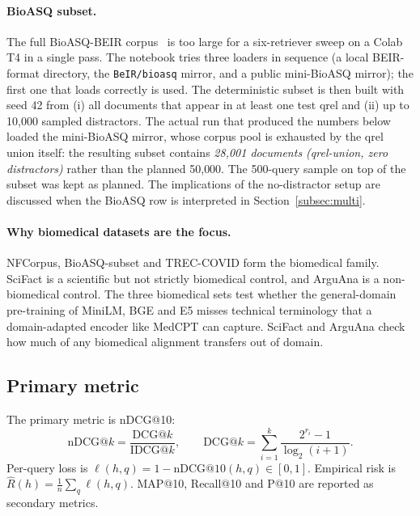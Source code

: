 \documentclass[11pt,a4paper]{article}
\begin{document}
\paragraph{BioASQ subset.}
The full BioASQ-BEIR corpus~\cite{Tsatsaronis2015BioASQ} is too large
for a six-retriever sweep on a Colab T4 in a single pass. The notebook
tries three loaders in sequence (a local BEIR-format directory, the
\texttt{BeIR/bioasq} mirror, and a public mini-BioASQ mirror); the first
one that loads correctly is used. The deterministic subset is then
built with seed 42 from (i) all documents that appear in at least one
test qrel and (ii) up to 10{,}000 sampled distractors. The actual run
that produced the numbers below loaded the mini-BioASQ mirror, whose
corpus pool is exhausted by the qrel union itself: the resulting subset
contains \emph{28{,}001 documents (qrel-union, zero distractors)}
rather than the planned 50{,}000. The 500-query sample on top of the
subset was kept as planned. The implications of the no-distractor
setup are discussed when the BioASQ row is interpreted in
Section~\ref{subsec:multi}.

\paragraph{Why biomedical datasets are the focus.}
NFCorpus, BioASQ-subset and TREC-COVID form the biomedical family.
SciFact is a scientific but not strictly biomedical control, and
ArguAna is a non-biomedical control. The three biomedical sets test
whether the general-domain pre-training of MiniLM, BGE and E5 misses
technical terminology that a domain-adapted encoder like MedCPT can
capture. SciFact and ArguAna check how much of any biomedical
alignment transfers out of domain.

\subsection{Primary metric}

The primary metric is nDCG@10:
\begin{equation}
    \text{nDCG@}k = \frac{\text{DCG@}k}{\text{IDCG@}k},
    \qquad
    \text{DCG@}k = \sum_{i=1}^{k} \frac{2^{r_i} - 1}{\log_2(i+1)}.
\end{equation}
Per-query loss is $\ell(h,q) = 1 - \text{nDCG@10}(h,q) \in [0,1]$.
Empirical risk is $\hat{R}(h) = \frac{1}{n}\sum_{q}\ell(h,q)$.
MAP@10, Recall@10 and P@10 are reported as secondary metrics.

\end{document}
